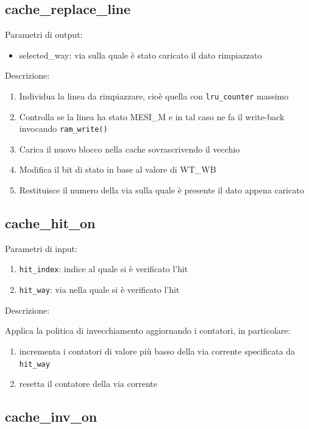 \subsection{cache\_replace\_line} %

Parametri di output:
\begin{itemize}
  \item selected\_way: via sulla quale \`e stato caricato il dato rimpiazzato
\end{itemize}

Descrizione:
\begin{enumerate}
  \item Individua la linea da rimpiazzare, cio\`e quella con \texttt{lru\_counter} massimo
  \item Controlla se la linea ha stato MESI\_M e in tal caso ne fa il write-back invocando \texttt{ram\_write()}
  \item Carica il nuovo blocco nella cache sovrascrivendo il vecchio
  \item Modifica il bit di stato in base al valore di WT\_WB
  \item Restituisce il numero della via sulla quale \`e presente il dato appena caricato
\end{enumerate}
		

\subsection{cache\_hit\_on} %

Parametri di input:
\begin{enumerate}
  \item \texttt{hit\_index}: indice al quale si \`e verificato l'hit
  \item \texttt{hit\_way}: via nella quale si \`e verificato l'hit
\end{enumerate}

Descrizione:

Applica la politica di invecchiamento aggiornando i contatori, in particolare:
\begin{enumerate}
  \item incrementa i contatori di valore pi\`u basso della via corrente specificata da \texttt{hit\_way}
  \item resetta il contatore della via corrente
\end{enumerate}	

\subsection{cache\_inv\_on} %

